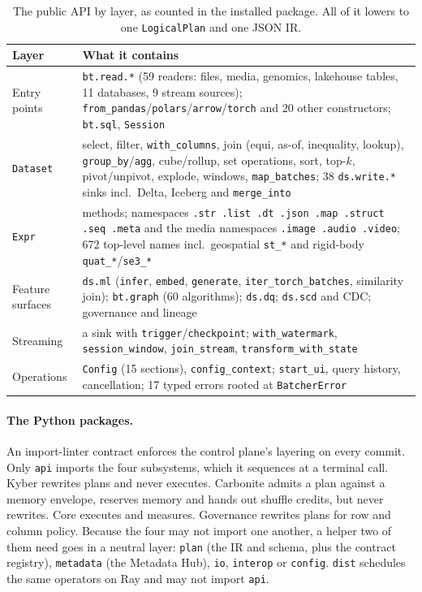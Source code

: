 \documentclass[10pt,twocolumn,letterpaper]{article}   %
\newcommand{\kyber}{Kyber}
\newcommand{\carbo}{Carbonite}
\begin{document}
\begin{table}[tbp]
\centering\scriptsize
\setlength{\tabcolsep}{2.4pt}
\begin{tabular}{@{}>{\raggedright\arraybackslash}p{}>{\raggedright\arraybackslash}p{}@{}}
\toprule
Layer & What it contains \\
\midrule
Entry points & \texttt{bt.read.*} (59 readers: files, media, genomics, lakehouse tables, 11 databases, 9 stream sources); \texttt{from\_pandas}/\texttt{polars}/\texttt{arrow}/\texttt{torch} and 20 other constructors; \texttt{bt.sql}, \texttt{Session} \\
\addlinespace[1pt]
\texttt{Dataset} & select, filter, \texttt{with\_columns}, join (equi, as-of, inequality, lookup), \texttt{group\_by}/\texttt{agg}, cube/rollup, set operations, sort, top-$k$, pivot/unpivot, explode, windows, \texttt{map\_batches}; 38 \texttt{ds.write.*} sinks incl.\ Delta, Iceberg and \texttt{merge\_into} \\
\addlinespace[1pt]
\texttt{Expr} & 191 methods; namespaces \texttt{.str .list .dt .json .map .struct .seq .meta} and the media namespaces \texttt{.image .audio .video}; 672 top-level names incl.\ geospatial \texttt{st\_*} and rigid-body \texttt{quat\_*}/\texttt{se3\_*} \\
\addlinespace[1pt]
Feature surfaces & \texttt{ds.ml} (\texttt{infer}, \texttt{embed}, \texttt{generate}, \texttt{iter\_torch\_batches}, similarity join); \texttt{bt.graph} (60 algorithms); \texttt{ds.dq}; \texttt{ds.scd} and CDC; governance and lineage \\
\addlinespace[1pt]
Streaming & a sink with \texttt{trigger}/\texttt{checkpoint}; \texttt{with\_watermark}, \texttt{session\_window}, \texttt{join\_stream}, \texttt{transform\_with\_state} \\
\addlinespace[1pt]
Operations & \texttt{Config} (15 sections), \texttt{config\_context}; \texttt{start\_ui}, query history, cancellation; 17 typed errors rooted at \texttt{BatcherError} \\
\bottomrule
\end{tabular}
\caption{The public API by layer, as counted in the installed package. All of it lowers to
one \texttt{LogicalPlan} and one JSON IR.}
\label{tab:api}
\end{table}

\paragraph{The Python packages.} An import-linter contract enforces the control plane's
layering on every commit. Only \texttt{api} imports the four subsystems, which
it sequences at a terminal call. \kyber{} rewrites plans and never executes. \carbo{} admits a
plan against a memory envelope, reserves memory and hands out shuffle credits, but never
rewrites. Core executes and measures. Governance rewrites plans for row and column policy.
Because the four may not import one another, a helper two of them need goes in a neutral
layer: \texttt{plan} (the IR and schema, plus the contract registry), \texttt{metadata} (the
Metadata Hub), \texttt{io}, \texttt{interop} or \texttt{config}. \texttt{dist} schedules the
same operators on Ray and may not import \texttt{api}.
\end{document}
